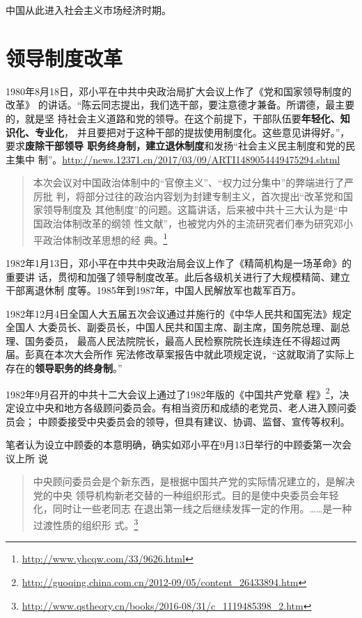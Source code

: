 中国从此进入社会主义市场经济时期。

\section{领导制度改革}


1980年8月18日，邓小平在中共中央政治局扩大会议上作了《党和国家领导制度的改革》
的讲话。“陈云同志提出，我们选干部，要注意德才兼备。所谓德，最主要的，就是坚
持社会主义道路和党的领导。在这个前提下，干部队伍要\textbf{年轻化、知识化、专业化}，
并且要把对于这种干部的提拔使用制度化。这些意见讲得好。”，要求\textbf{废除干部领导
  职务终身制，建立退休制度}和发扬“社会主义民主制度和党的民主集中
制”。\url{http://news.12371.cn/2017/03/09/ARTI1489054449475294.shtml}
\begin{quotation}
  本次会议对中国政治体制中的“官僚主义”、“权力过分集中”的弊端进行了严厉批
  判，将部分过往的政治内容划为封建专制主义，首次提出“改革党和国家领导制度及
  其他制度”的问题。这篇讲话，后来被中共十三大认为是“中国政治体制改革的纲领
  性文献”，也被党内外的主流研究者们奉为研究邓小平政治体制改革思想的经
  典。\footnote{\url{http://www.yhcqw.com/33/9626.html}}
\end{quotation}

1982年1月13日，邓小平在中共中央政治局会议上作了《精简机构是一场革命》的重要讲
话，贯彻和加强了领导制度改革。此后各级机关进行了大规模精简、建立干部离退休制
度等。1985年到1987年，中国人民解放军也裁军百万。

1982年12月4日全国人大五届五次会议通过并施行的《中华人民共和国宪法》规定全国人
大委员长、副委员长，中国人民共和国主席、副主席，国务院总理、副总理、国务委员，
最高人民法院院长，最高人民检察院院长连续连任不得超过两届。彭真在本次大会所作
宪法修改草案报告中就此项规定说，“这就取消了实际上存在的\textbf{领导职务的终身制}。”


1982年9月召开的中共十二大会议上通过了1982年版的《中国共产党章
程》\footnote{\url{http://guoqing.china.com.cn/2012-09/05/content_26433894.htm}}，决
定设立中央和地方各级顾问委员会。有相当资历和成绩的老党员、老人进入顾问委员会；
中顾委接受中央委员会的领导，但具有建议、协调、监督、宣传等权利。

笔者认为设立中顾委的本意明确，确实如邓小平在9月13日举行的中顾委第一次会议上所
说
\begin{quotation}
  中央顾问委员会是个新东西，是根据中国共产党的实际情况建立的，是解决党的中央
  领导机构新老交替的一种组织形式。目的是使中央委员会年轻化，同时让一些老同志
  在退出第一线之后继续发挥一定的作用。……是一种过渡性质的组织形
  式。\footnote{\url{http://www.qstheory.cn/books/2016-08/31/c_1119485398_2.htm}}
\end{quotation}

